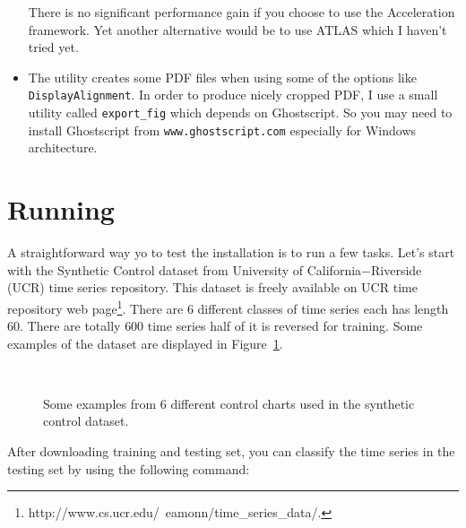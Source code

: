 \documentclass{article}
\newcommand{\parametre}[1]{\texttt{#1}}
\newcommand{\matlabfile}[1]{}
\begin{document}
\begin{itemize}
\begin{scriptsize}
\matlabfile{tscu_manual_verbatim05.out}
\end{scriptsize}

There is no significant performance gain if you choose to use the Acceleration framework. 
Yet another alternative would be to use ATLAS which I haven't tried yet. 

\item%
The utility creates some PDF files when using some of the options like \parametre{DisplayAlignment}. In order to produce nicely cropped PDF, I use a small utility called \parametre{export\_fig} which depends on Ghostscript. So you may need to install Ghostscript from \verb|www.ghostscript.com|  especially for Windows architecture.
\end{itemize}

\section{Running}
A straightforward way yo to test the installation is to run a few tasks. Let's start with the Synthetic Control dataset from University of California$-$Riverside (UCR) time series repository. This dataset is freely available on UCR time repository web page\footnote{http://www.cs.ucr.edu/~eamonn/time\_series\_data/.}. There are $6$ different classes of time series each has length $60$. There are totally $600$ time series half of it is reversed for training. Some examples of the dataset are displayed in Figure~\ref{fig_synthetic}.

	\begin{figure}[!h]
	\centering%
	\\%
	\caption{Some examples from 6 different control charts used in the synthetic control dataset.}
	\label{fig_synthetic}
	\end{figure}

After downloading training and testing set, you can classify the time series in the testing set by using the following command:
\end{document}
